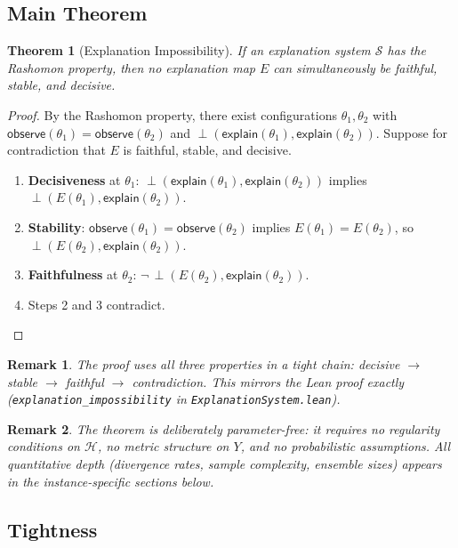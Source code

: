 \documentclass{article}
\newtheorem{theorem}{Theorem}
\newtheorem{remark}{Remark}
\newcommand{\sH}{\mathcal{H}}
\newcommand{\incomp}{\perp}                  %
\begin{document}
\subsection{Main Theorem}

\begin{theorem}[Explanation Impossibility]
\label{thm:universal}
If an explanation system $\mathcal{S}$ has the Rashomon property, then no
explanation map $E$ can simultaneously be faithful, stable, and decisive.
\end{theorem}

\begin{proof}
By the Rashomon property, there exist configurations $\theta_1, \theta_2$ with
$\mathsf{observe}(\theta_1) = \mathsf{observe}(\theta_2)$ and
$\incomp(\mathsf{explain}(\theta_1), \mathsf{explain}(\theta_2))$.
Suppose for contradiction that $E$ is faithful, stable, and decisive.
\begin{enumerate}
  \item \textbf{Decisiveness} at $\theta_1$:
    $\incomp(\mathsf{explain}(\theta_1), \mathsf{explain}(\theta_2))$
    implies
    $\incomp(E(\theta_1), \mathsf{explain}(\theta_2))$.
  \item \textbf{Stability}:
    $\mathsf{observe}(\theta_1) = \mathsf{observe}(\theta_2)$
    implies $E(\theta_1) = E(\theta_2)$, so
    $\incomp(E(\theta_2), \mathsf{explain}(\theta_2))$.
  \item \textbf{Faithfulness} at $\theta_2$:
    $\neg\,\incomp(E(\theta_2), \mathsf{explain}(\theta_2))$.
  \item Steps 2 and 3 contradict.  \qedhere
\end{enumerate}
\end{proof}

\begin{remark}
The proof uses all three properties in a tight chain:
decisive $\to$ stable $\to$ faithful $\to$ contradiction.
This mirrors the Lean proof exactly (\texttt{explanation\_impossibility} in
\texttt{ExplanationSystem.lean}).
\end{remark}

\begin{remark}
The theorem is deliberately parameter-free: it requires no regularity
conditions on $\sH$, no metric structure on $Y$, and no probabilistic
assumptions.  All quantitative depth (divergence rates, sample complexity,
ensemble sizes) appears in the instance-specific sections below.
\end{remark}

\subsection{Tightness}
\label{sec:tightness}
\end{document}
